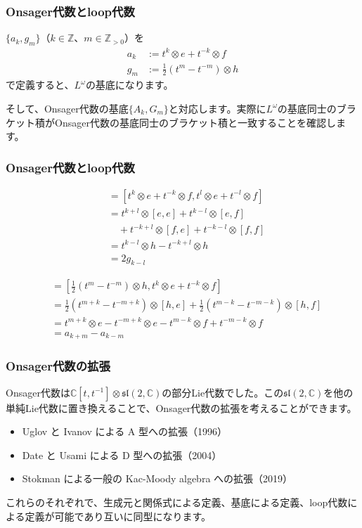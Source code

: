 \documentclass{beamer}
\begin{document}
\begin{frame}
    \frametitle{Onsager代数とloop代数}

    $\{a_k,g_m\}$（$k∈ℤ$、$m∈ℤ_{>0}$）を
    \begin{align}
        a_k & :=t^k⊗e+t^{-k}⊗f            \\
        g_m & :=\frac{1}{2}(t^m-t^{-m})⊗h
    \end{align}
    で定義すると、$L^ω$の基底になります。

    \bigskip

    そして、Onsager代数の基底$\{A_k,G_m\}$と対応します。実際に$L^ω$の基底同士のブラケット積がOnsager代数の基底同士のブラケット積と一致することを確認します。
\end{frame}

\begin{frame}
    \frametitle{Onsager代数とloop代数}

    \begin{align}
        [a_k,a_l] & = [t^k⊗e+t^{-k}⊗f,t^l⊗e+t^{-l}⊗f]    \\
                  & = t^{k+l}⊗[e,e]+t^{k-l}⊗[e,f]        \\
                  & \quad +t^{-k+l}⊗[f,e]+t^{-k-l}⊗[f,f] \\
                  & = t^{k-l}⊗h-t^{-k+l}⊗h               \\
                  & = 2g_{k-l}
    \end{align}

    \begin{align}
        [g_m,a_k] & = \left[\frac{1}{2}(t^m-t^{-m})⊗h,t^k⊗e+t^{-k}⊗f\right]                   \\
                  & = \frac{1}{2}(t^{m+k}-t^{-m+k})⊗[h,e]+\frac{1}{2}(t^{m-k}-t^{-m-k})⊗[h,f] \\
                  & = t^{m+k}⊗e-t^{-m+k}⊗e-t^{m-k}⊗f+t^{-m-k}⊗f                               \\
                  & = a_{k+m}-a_{k-m}
    \end{align}
\end{frame}

\begin{frame}
    \frametitle{Onsager代数の拡張}

    Onsager代数は$ℂ[t,t^{-1}]⊗\mathfrak{sl}(2,ℂ)$の部分Lie代数でした。この$\mathfrak{sl}(2,ℂ)$を他の単純Lie代数に置き換えることで、Onsager代数の拡張を考えることができます。

    \bigskip

    \begin{itemize}
        \item Uglov と Ivanov による A 型への拡張（1996）
        \item Date と Usami による D 型への拡張（2004）
        \item Stokman による一般の Kac-Moody algebra への拡張（2019）
    \end{itemize}

    \bigskip

    これらのそれぞれで、生成元と関係式による定義、基底による定義、loop代数による定義が可能であり互いに同型になります。
\end{frame}
\end{document}
